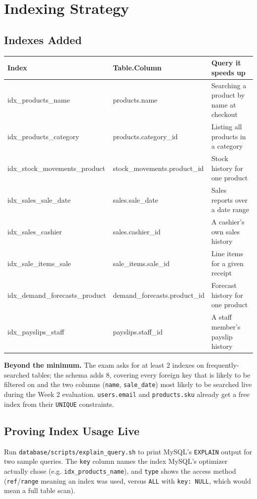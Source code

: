 \documentclass[11pt,a4paper]{report}
\begin{document}
\chapter{Indexing Strategy}

\section{Indexes Added}
\begin{center}
\begin{tabular}{@{}p{4.6cm}p{4.9cm}p{4.5cm}@{}}
\toprule
\textbf{Index} & \textbf{Table.Column} & \textbf{Query it speeds up} \\
\midrule
idx\_products\_name & products.name & Searching a product by name at checkout \\
idx\_products\_category & products.category\_id & Listing all products in a category \\
idx\_stock\_movements\_product & stock\_movements.product\_id & Stock history for one product \\
idx\_sales\_sale\_date & sales.sale\_date & Sales reports over a date range \\
idx\_sales\_cashier & sales.cashier\_id & A cashier's own sales history \\
idx\_sale\_items\_sale & sale\_items.sale\_id & Line items for a given receipt \\
idx\_demand\_forecasts\_product & demand\_forecasts.product\_id & Forecast history for one product \\
idx\_payslips\_staff & payslips.staff\_id & A staff member's payslip history \\
\bottomrule
\end{tabular}
\end{center}

\begin{infobox}
\textbf{Beyond the minimum.} The exam asks for at least 2 indexes on
frequently-searched tables; the schema adds 8, covering every foreign key
that is likely to be filtered on and the two columns (\texttt{name},
\texttt{sale\_date}) most likely to be searched live during the Week 2
evaluation. \texttt{users.email} and \texttt{products.sku} already get a
free index from their \texttt{UNIQUE} constraints.
\end{infobox}

\section{Proving Index Usage Live}
Run \texttt{database/scripts/explain\_query.sh} to print MySQL's
\texttt{EXPLAIN} output for two sample queries. The \texttt{key} column
names the index MySQL's optimizer actually chose (e.g.
\texttt{idx\_products\_name}), and \texttt{type} shows the access method
(\texttt{ref}/\texttt{range} meaning an index was used, versus \texttt{ALL}
with \texttt{key: NULL}, which would mean a full table scan).
\end{document}
